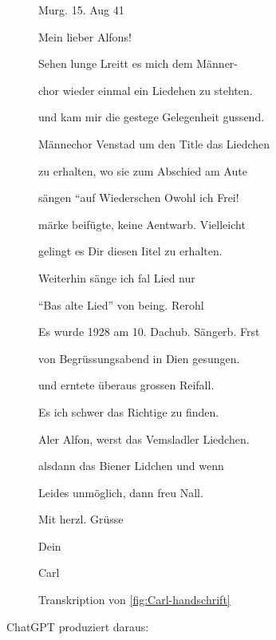 \documentclass[12pt, a4paper, ngerman, bidi=default]{article}
\begin{document}
  \begin{figure}[htbp]
  \centering
  \begin{tcolorbox}[colback=oldLetter, colframe=black, sharp corners, width=\textwidth]
    Murg. 15. Aug 41 

    
    Mein lieber Alfons! 

    Sehen lunge Lreitt es mich dem Männer- 

    chor wieder einmal ein Liedehen zu stehten. 

    und kam mir die gestege Gelegenheit gussend. 

    Männechor Venstad um den Title das Liedchen 

    zu erhalten, wo sie zum Abschied am Aute 

    sängen ``auf Wiederschen Owohl ich Frei! 

    märke beifügte, keine Aentwarb. Vielleicht 

    gelingt es Dir diesen Iitel zu erhalten. 
    
    Weiterhin sänge ich fal Lied nur 
    
    ``Bas alte Lied'' von being. Rerohl 

    Es wurde 1928 am 10. Dachub. Sängerb. Frst 

    von Begrüssungsabend in Dien gesungen. 

    und erntete überaus grossen Reifall. 

    Es ich schwer das Richtige zu finden. 

    Aler Alfon, werst das Vemsladler Liedchen. 

    alsdann das Biener Lidchen und wenn 

    Leides unmöglich, dann freu Nall. 

    Mit herzl. Grüsse 

    Dein 

    Carl 
  \end{tcolorbox}
  \caption{Transkription von \autoref{fig:Carl-handschrift}}
  \label{fig:Carl-Transkribus}

\end{figure}

ChatGPT produziert daraus:
\end{document}
